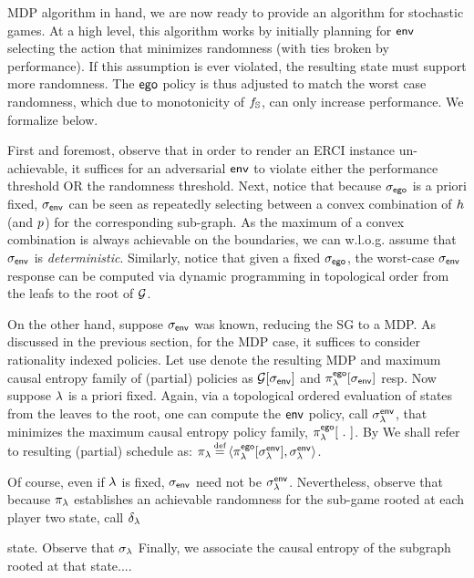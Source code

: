 MDP algorithm in hand, we are now ready to provide an algorithm for
stochastic games. At a high level, this algorithm works by initially
planning for $\mathsf{env}$ selecting the action that minimizes randomness
(with ties broken by performance). If this assumption is ever
violated, the resulting state must support more randomness.
The $\mathsf{ego}$ policy is thus adjusted to match the worst case
randomness, which due to monotonicity of $f_\mathbb{S}$, can only
increase performance. We formalize below.

First and foremost, observe that in order to render an ERCI instance
un-achievable, it suffices for an adversarial $\mathsf{env}$ to violate
either the performance threshold OR the randomness threshold.  Next,
notice that because ${\sigma_{\mathsf{ego}}}$ is a priori fixed, ${\sigma_{\mathsf{env}}}$ can
be seen as repeatedly selecting between a convex combination of
$h$ (and $p$) for the corresponding sub-graph. As the maximum of a
convex combination is always achievable on the boundaries, we can
w.l.o.g. assume that ${\sigma_{\mathsf{env}}}$ is \emph{deterministic}.  Similarly,
notice that given a fixed ${\sigma_{\mathsf{ego}}}$, the worst-case ${\sigma_{\mathsf{env}}}$
response can be computed via dynamic programming in topological order
from the leafs to the root of $\mathcal{G}$.

On the other hand, suppose ${\sigma_{\mathsf{env}}}$ was known, reducing the SG to
a MDP. As discussed in the previous section, for the MDP case, it
suffices to consider rationality indexed policies. Let use denote the
resulting MDP and maximum causal entropy family of (partial) policies
as $\mathcal{G}[{\sigma_{\mathsf{env}}}]$ and $\pi^{\mathsf{ego}}_\lambda[{\sigma_{\mathsf{env}}}]$ resp. Now
suppose $\lambda$ is a priori fixed. Again, via a topological ordered
evaluation of states from the leaves to the root, one can compute the
$\mathsf{env}$ policy, call $\sigma_\lambda^{\mathsf{env}}$, that minimizes the maximum
causal entropy policy family, $\pi^{\mathsf{ego}}_\lambda[~.~]$. By
We shall refer to resulting (partial) schedule as: $\pi_\rat \eqdef \langle
\pi^\pOne_\rat[\sched_\rat^\pTwo] , \sched_\rat^\pTwo \rangle$.


Of course, even if $\lambda$ is fixed, ${\sigma_{\mathsf{env}}}$ need not be
$\sigma^{\mathsf{env}}_\lambda$. Nevertheless, observe that because
$\pi_\lambda$ establishes an achievable randomness for the
sub-game rooted at each player two state, call $\delta_\lambda$


state.
Observe that $\sigma_\lambda$
Finally, we associate the causal entropy of the subgraph rooted
at that state....




